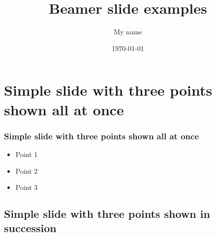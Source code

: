 \documentclass[]{beamer}
\title{Beamer slide examples}    %
\author{My name}                 %
\institute{My organization}      %
\date{\today}                    %
\begin{document}
\begin{frame}
  \titlepage
\end{frame}

\section[Outline]{}

\begin{frame}
  \tableofcontents
\end{frame}


\section{Simple slide with three points shown all at once}

\begin{frame}
  \frametitle{Simple slide with three points shown all at once}   %

  \begin{itemize}
  \item Point 1
  \item Point 2
  \item Point 3
  \end{itemize}
\end{frame}

\subsection{Simple slide with three points shown in succession}
\end{document}
